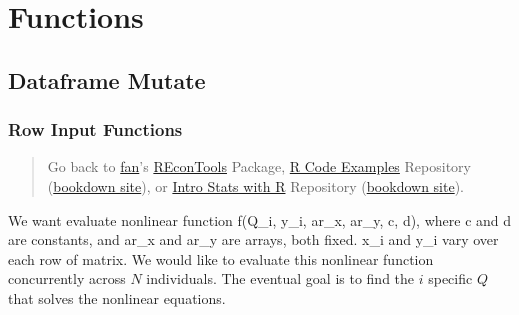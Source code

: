 \documentclass[
]{book}
\begin{document}
\begin{table}[!h]
\centering
{}
\end{table}

\hypertarget{functions}{%
\chapter{Functions}\label{functions}}

\hypertarget{dataframe-mutate}{%
\section{Dataframe Mutate}\label{dataframe-mutate}}

\hypertarget{row-input-functions}{%
\subsection{Row Input Functions}\label{row-input-functions}}

\begin{quote}
Go back to \href{http://fanwangecon.github.io/}{fan}'s \href{https://fanwangecon.github.io/REconTools/}{REconTools} Package, \href{https://fanwangecon.github.io/R4Econ/}{R Code Examples} Repository (\href{https://fanwangecon.github.io/R4Econ/bookdown}{bookdown site}), or \href{https://fanwangecon.github.io/Stat4Econ/}{Intro Stats with R} Repository (\href{https://fanwangecon.github.io/Stat4Econ/bookdown}{bookdown site}).
\end{quote}

We want evaluate nonlinear function f(Q\_i, y\_i, ar\_x, ar\_y, c, d), where c and d are constants, and ar\_x and ar\_y are arrays, both fixed. x\_i and y\_i vary over each row of matrix. We would like to evaluate this nonlinear function concurrently across \(N\) individuals. The eventual goal is to find the \(i\) specific \(Q\) that solves the nonlinear equations.
\end{document}
